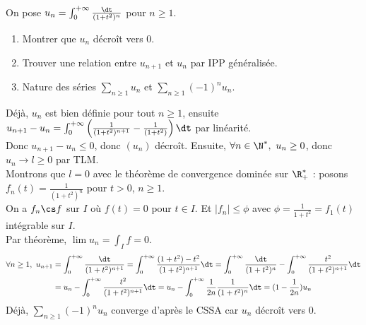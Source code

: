 \documentclass[11pt]{article}
\begin{document}
\begin{ex}{}{}
    On pose $u_n=\int_0^{+\infty}\frac{\dt}{(1+t^2)^n}$ pour $n\geq1$.
    \begin{enumerate}
        \item Montrer que $u_n$ décroît vers 0.
        \item Trouver une relation entre $u_{n+1}$ et $u_n$ par IPP généralisée.
        \item Nature des séries $\sum_{n\geq1}u_n$ et $\sum_{n\geq1}(-1)^nu_n$.
    \end{enumerate}
    \tcblower
     Déjà, $u_n$ est bien définie pour tout $n\geq1$, ensuite $u_{n+1}-u_n=\int_0^{+\infty}\left( \frac{1}{(1+t^2)^{n+1}} - \frac{1}{(1+t^2)} \right)\dt$ par linéarité.\\
    Donc $u_{n+1}-u_n\leq0$, donc $(u_n)$ décroît. Ensuite, $\forall n \in \N^*, ~ u_n\geq0$, donc $u_n\to l\geq0$ par TLM.\\
    Montrons que $l=0$ avec le théorème de convergence dominée sur $\R_+^*$ : posons $f_n(t)=\frac{1}{(1+t^2)^n}$ pour $t>0$, $n\geq1$.\\
    On a $f_n\cs f$ sur $I$ où $f(t)=0$ pour $t\in I$. Et $|f_n|\leq \phi$ avec $\phi=\frac{1}{1+t^2}=f_1(t)$ intégrable sur $I$.\\
    Par théorème, $\lim u_n = \int_I f = 0$.\\
    \begin{align*}
        \forall n \geq 1, ~ u_{n+1} &= \int_0^{+\infty}\frac{\dt}{(1+t^2)^{n+1}} = \int_0^{+\infty}\frac{(1+t^2)-t^2}{(1+t^2)^{n+1}}\dt = \int_0^{+\infty}\frac{\dt}{(1+t^2)^n}-\int_0^{+\infty}\frac{t^2}{(1+t^2)^{n+1}}\dt\\
        &=u_n - \int_0^{+\infty}\frac{t^2}{(1+t^2)^{n+1}}\dt = u_n - \int_0^{+\infty}\frac{1}{2n}\frac{1}{(1+t^2)^n}\dt=(1-\frac{1}{2n})u_n
    \end{align*}
     Déjà, $\sum_{n\geq1}(-1)^nu_n$ converge d'après le CSSA car $u_n$ décroît vers 0.
\end{ex}
\end{document}

